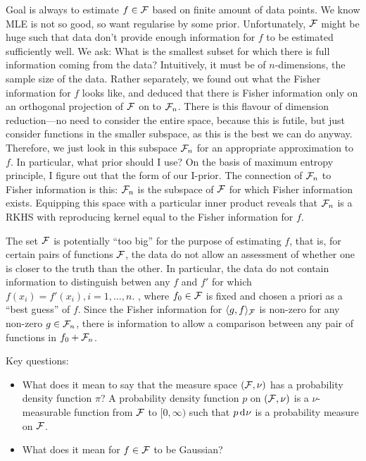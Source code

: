 \documentclass[a4paper,showframe,11pt,draft]{report}
\begin{document}
Goal is always to estimate $f \in {\mathcal F}$ based on finite amount of data points.
We know MLE is not so good, so want regularise by some prior.
Unfortunately, ${\mathcal F}$ might be huge such that data don't provide enough information for $f$ to be estimated sufficiently well.
We ask: What is the smallest subset for which there is full information coming from the data? 
Intuitively, it must be of $n$-dimensions, the sample size of the data.
Rather separately, we found out what the Fisher information for $f$ looks like, and deduced that there is Fisher information only on an orthogonal projection of ${\mathcal F}$ on to ${\mathcal F}_n$.
There is this flavour of dimension reduction---no need to consider the entire space, because this is futile, but just consider functions in the smaller subspace, as this is the best we can do anyway.
Therefore, we just look in this subspace ${\mathcal F}_n$ for an appropriate approximation to $f$. 
In particular, what prior should I use? On the basis of maximum entropy principle, I figure out that the form of our I-prior.
The connection of ${\mathcal F}_n$ to Fisher information is this: ${\mathcal F}_n$ is the subspace of ${\mathcal F}$ for which Fisher information exists. Equipping this space with a particular inner product reveals that ${\mathcal F}_n$ is a RKHS with reproducing kernel equal to the Fisher information for $f$.

The set ${\mathcal F}$ is potentially ``too big'' for the purpose of estimating $f$, that is, for certain pairs of functions ${\mathcal F}$, the data do not allow an assessment of whether one is closer to the truth than the other.
In particular, the data do not contain information to distinguish betwen any $f$ and $f'$ for which $f(x_i) = f'(x_i), i=1,\dots,n$.
  , where $f_0 \in {\mathcal F}$ is fixed and chosen a priori as a ``best guess'' of $f$.
Since the Fisher information for $\langle g,f\rangle_{\mathcal F}$ is non-zero for any non-zero $g \in {\mathcal F}_n$, there is information to allow a comparison between any pair of functions in $f_0 + {\mathcal F}_n$.

Key questions:
\begin{itemize}
  \item What does it mean to say that the measure space $({\mathcal F},\nu)$ has a probability density function $\pi$? A probability density function $p$ on $({\mathcal F}, \nu)$ is a $\nu$-measurable function from ${\mathcal F}$ to $[0, \infty)$ such that $p \operatorname{d\!\:\!}\nu$ is a probability measure on ${\mathcal F}$.
  \item What does it mean for $f \in {\mathcal F}$ to be Gaussian?
\end{itemize}
\end{document}
